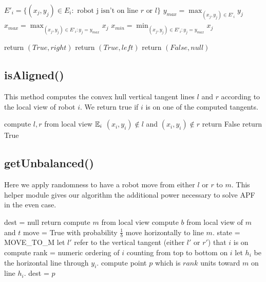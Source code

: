 \documentclass[preprint,10pt]{elsarticle}
\begin{document}
\begin{algorithm}[H]
\begin{algorithmic}[1]
	\State $E'_i = \{ (x_j, y_j) \in E_i : \text{ robot j isn't on line } r \text{ or } l\}$
	\State $y_{max} = \max_{(x_j, y_j) \in E'_i}{y_j}$ 
	\State $x_{max} = \max_{(x_j, y_j) \in E'_i : y_j = y_{max} }{x_j}$ 
	\State $x_{min} = \min_{(x_j, y_j) \in E'_i : y_j = y_{max} }{x_j}$ 

		\State return $(True, right)$
		\State return $(True, left)$
	\Else
		\State return $(False, null)$
	\EndIf

\EndProcedure
\end{algorithmic}
\end{algorithm}

\subsection{isAligned()} 

	This method computes the convex hull vertical tangent lines $l$ and $r$ according
	to the local view of robot $i$. We return true if $i$ is on one of the 
	computed tangents.
\begin{algorithm}[H]
\begin{algorithmic}[1]
	\State compute $l,r$ from local view $\mathbb{E}_i$
	\If $(x_i, y_i) \notin  l$ and $(x_i, y_i) \notin r$
		\State return False
	\Else 
		\State return True
	\EndIf
\EndProcedure
\end{algorithmic}
\end{algorithm}

\subsection{getUnbalanced()} 
	Here we apply randomness to have a robot move from either $l$ or $r$ to $m$.
	This helper module gives our algorithm the additional power necessary to 
	solve APF in the even case.
\begin{algorithm}[H]
\begin{algorithmic}[1]
		\State dest = null
		\State return
	\EndIf
	\State compute $m$ from local view
	\State compute $b$ from local view of $m$ and $t$
	\State move = True with probability $\frac{1}{b}$ \Comment move horizontally to line $m$. 
		\State state = MOVE\_TO\_M
		\State let $l'$ refer to the vertical tangent (either $l'$ or $r'$) that $i$ is on
		\State compute rank = numeric ordering of $i$ counting from top to bottom on $i$
		\State let $h_i$ be the horizontal line through $y_i$. 
		\State compute point $p$ which is $rank$ units toward $m$ on line $h_i$.
		\State dest = $p$
	\EndIf


\EndProcedure
\end{algorithmic}
\end{algorithm}
\end{document}

